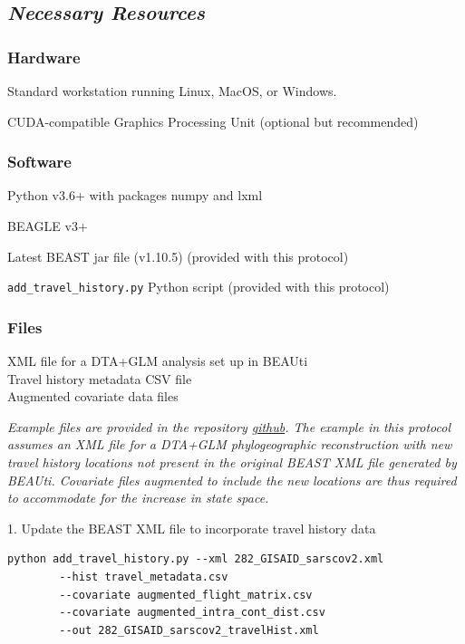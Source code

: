 \documentclass{article}
\newcommand{\ann}[1]{
\begin{adjustwidth}{0.5cm}{}
\it{#1}\\
\end{adjustwidth}}
\begin{document}
\subsection*{\textbf{\textit{Necessary Resources}}}
\subsubsection*{Hardware}
\hspace{0.5cm}Standard workstation running Linux, MacOS, or Windows.

\hspace{0.5cm}CUDA-compatible Graphics Processing Unit (optional but recommended)

\subsubsection*{Software}
\hspace{0.5cm}Python v3.6+ with packages numpy and lxml

\hspace{0.5cm}BEAGLE v3+

\hspace{0.5cm}Latest BEAST jar file (v1.10.5) (provided with this protocol)

\hspace{0.5cm}\verb|add_travel_history.py| Python script (provided with this protocol)

\subsubsection*{Files}
XML file for a DTA+GLM analysis set up in BEAUti \\
Travel history metadata CSV file \\
Augmented covariate data files \\

\ann{Example files are provided in the repository {\upshape\url{github}}. %
The example in this protocol assumes an XML file for a DTA+GLM phylogeographic reconstruction with new travel history locations not present in the original BEAST XML file generated by BEAUti.
Covariate files augmented to include the new locations are thus required to accommodate for the increase in state space.}

1. Update the BEAST XML file to incorporate travel history data
\begin{verbatim}
python add_travel_history.py --xml 282_GISAID_sarscov2.xml
        --hist travel_metadata.csv
        --covariate augmented_flight_matrix.csv
        --covariate augmented_intra_cont_dist.csv
        --out 282_GISAID_sarscov2_travelHist.xml
\end{verbatim}
\end{document}

